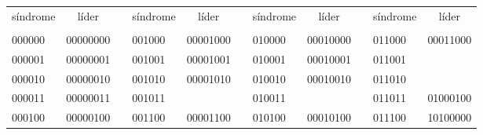 \documentclass[11pt,spanish]{book}
\begin{document}
\begin{table}[H]
\centering
\begin{tabular}{lllllllllll}
\cline{1-2} \cline{4-5} \cline{7-8} \cline{10-11}
\multicolumn{1}{|c|}{síndrome} & \multicolumn{1}{c|}{líder} & \multicolumn{1}{c|}{} & \multicolumn{1}{c|}{síndrome} & \multicolumn{1}{c|}{líder} & \multicolumn{1}{c|}{} & \multicolumn{1}{c|}{síndrome} & \multicolumn{1}{c|}{líder} & \multicolumn{1}{c|}{} & \multicolumn{1}{c|}{síndrome} & \multicolumn{1}{c|}{líder} \\ \cline{1-2} \cline{4-5} \cline{7-8} \cline{10-11} 
 &  &  &  &  &  &  &  &  &  &  \\ \cline{1-2} \cline{4-5} \cline{7-8} \cline{10-11} 
\multicolumn{1}{|l|}{000000} & \multicolumn{1}{l|}{00000000} & \multicolumn{1}{l|}{} & \multicolumn{1}{l|}{001000} & \multicolumn{1}{l|}{00001000} & \multicolumn{1}{l|}{} & \multicolumn{1}{l|}{010000} & \multicolumn{1}{l|}{00010000} & \multicolumn{1}{l|}{} & \multicolumn{1}{l|}{011000} & \multicolumn{1}{l|}{00011000} \\ \cline{1-2} \cline{4-5} \cline{7-8} \cline{10-11} 
\multicolumn{1}{|l|}{000001} & \multicolumn{1}{l|}{00000001} & \multicolumn{1}{l|}{} & \multicolumn{1}{l|}{001001} & \multicolumn{1}{l|}{00001001} & \multicolumn{1}{l|}{} & \multicolumn{1}{l|}{010001} & \multicolumn{1}{l|}{00010001} & \multicolumn{1}{l|}{} & \multicolumn{1}{l|}{011001} & \multicolumn{1}{l|}{} \\ \cline{1-2} \cline{4-5} \cline{7-8} \cline{10-11} 
\multicolumn{1}{|l|}{000010} & \multicolumn{1}{l|}{00000010} & \multicolumn{1}{l|}{} & \multicolumn{1}{l|}{001010} & \multicolumn{1}{l|}{00001010} & \multicolumn{1}{l|}{} & \multicolumn{1}{l|}{010010} & \multicolumn{1}{l|}{00010010} & \multicolumn{1}{l|}{} & \multicolumn{1}{l|}{011010} & \multicolumn{1}{l|}{} \\ \cline{1-2} \cline{4-5} \cline{7-8} \cline{10-11} 
\multicolumn{1}{|l|}{000011} & \multicolumn{1}{l|}{00000011} & \multicolumn{1}{l|}{} & \multicolumn{1}{l|}{001011} & \multicolumn{1}{l|}{} & \multicolumn{1}{l|}{} & \multicolumn{1}{l|}{010011} & \multicolumn{1}{l|}{} & \multicolumn{1}{l|}{} & \multicolumn{1}{l|}{011011} & \multicolumn{1}{l|}{01000100} \\ \cline{1-2} \cline{4-5} \cline{7-8} \cline{10-11} 
\multicolumn{1}{|l|}{000100} & \multicolumn{1}{l|}{00000100} & \multicolumn{1}{l|}{} & \multicolumn{1}{l|}{001100} & \multicolumn{1}{l|}{00001100} & \multicolumn{1}{l|}{} & \multicolumn{1}{l|}{010100} & \multicolumn{1}{l|}{00010100} & \multicolumn{1}{l|}{} & \multicolumn{1}{l|}{011100} & \multicolumn{1}{l|}{10100000} \\ \cline{1-2} \cline{4-5} \cline{7-8} \cline{10-11} 

\end{tabular}
\end{table}
\end{document}
